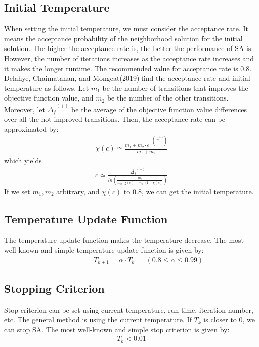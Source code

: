 \documentclass[11pt]{article}
\begin{document}
\begin{spacing}{1.5}
{\centering\subsection{Initial Temperature}}
When setting the initial temperature, we must consider the acceptance rate. It means the acceptance probability of the neighborhood solution for the initial solution. The higher the acceptance rate is, the better the performance of SA is. However, the number of iterations increases as the acceptance rate increases and it makes the longer runtime. The recommended value for acceptance rate is $0.8$.\\
\indent Delahye, Chaimatanan, and Mongeat(2019) find the acceptance rate and initial temperature as follows\cite{SA}. Let $m_1$ be the number of transitions that improves the objective function value, and $m_2$ be the number of the other transitions. Moreover, let $\bar{\Delta_f}^{(+)}$ be the average of the objective function value differences over all the not improved transitions. Then, the acceptance rate can be approximated by:
\begin{align}
    \chi(c) \simeq \frac{m_1+m_2\cdot e^{-(\frac{\bar{\Delta_f}^{(+)}}{c})}}{m_1+m_2}
\end{align}
which yields
\begin{align}
    c \simeq\frac{\bar{\Delta_f}^{(+)}}{ln(\frac{m_2}{m_2\cdot\chi(c)-m_1\cdot(1-\chi(c)})}
\end{align}
\indent If we set $m_1, m_2$ arbitrary, and $\chi(c)$ to $0.8$, we can get the initial temperature.


{\centering\subsection{Temperature Update Function}}
The temperature update function makes the temperature decrease. The most well-known and simple temperature update function is given by:
\begin{align}
     &&&&&&T_{k+1}=\alpha\cdot T_k  &&(0.8 \le\alpha\le0.99)
\end{align}


{\centering\subsection{Stopping Criterion}}
Stop criterion can be set using current temperature, run time, iteration number, etc. The general method is using the current temperature. If $T_k$ is closer to $0$, we can stop SA. The most well-known and simple stop criterion is given by:
\begin{align}
    T_k<0.01
\end{align}


\end{spacing}
\end{document}
